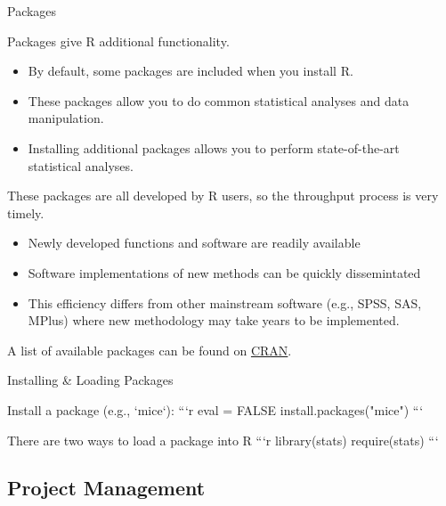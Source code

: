 \documentclass[10pt]{beamer}
\begin{document}
\begin{frame}{Packages}

Packages give R additional functionality. 

\begin{itemize}
\item By default, some packages are included when you install R.
\item These packages allow you to do common statistical analyses and data
  manipulation.
\item Installing additional packages allows you to perform state-of-the-art
  statistical analyses. 
\end{itemize}

These packages are all developed by R users, so the throughput process is very 
timely.

\begin{itemize}
\item Newly developed functions and software are readily available
\item Software implementations of new methods can be quickly dissemintated
\item This efficiency differs from other mainstream software (e.g., SPSS, SAS, 
  MPlus) where new methodology may take years to be implemented. 
\end{itemize}

A list of available packages can be found on \href{https://cran.r-project.org}{CRAN}.


\begin{frame}{Installing \& Loading Packages}

Install a package (e.g., `mice`):
```{r eval = FALSE}
install.packages("mice")
```

There are two ways to load a package into R
```{r}
library(stats)
require(stats)
```

\end{frame}


\subsection{Project Management}



\end{frame}
\end{document}
